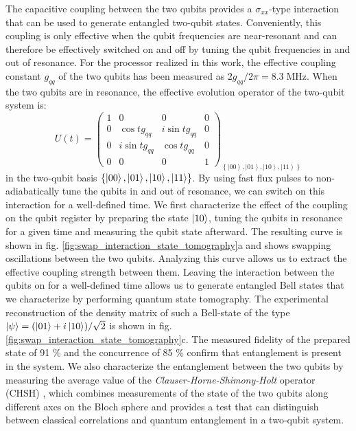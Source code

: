 The capacitive coupling between the two qubits provides a $\sigma_{xx}$-type
interaction that can be used to generate entangled two-qubit states.
Conveniently, this coupling is only effective when the qubit frequencies
are near-resonant and can therefore be effectively switched on and
off by tuning the qubit frequencies in and out of resonance. For the
processor realized in this work, the effective coupling constant $g_{qq}$
of the two qubits has been measured as $2g_{qq}/2\pi=8.3\;\mathrm{MHz}$.
When the two qubits are in resonance, the effective evolution operator
of the two-qubit system is:
%
\begin{equation}
U(t)=\left(\begin{array}{cccc}
1 & 0 & 0 & 0\\
0 & \cos{tg_{qq}} & i\sin{tg_{qq}} & 0\\
0 & i\sin{tg_{qq}} & \cos{tg_{qq}} & 0\\
0 & 0 & 0 & 1\end{array}\right)_{\left\{ \left|00\right\rangle ,\left|01\right\rangle ,\left|10\right\rangle ,\left|11\right\rangle \right\} } \label{eq:swap_evolution_operator}
\end{equation}
%
in the two-qubit basis $\{\left| 00 \right>,\left| 01 \right>,\left| 10 \right>,\left| 11 \right>\}$. By using fast flux pulses to non-adiabatically tune the qubits in
and out of resonance, we can switch on this interaction for a well-defined
time. We first characterize the effect of the coupling on the qubit
register by preparing the state $\left| 10 \right>$, tuning the qubits in
resonance for a given time and measuring the qubit state afterward.
The resulting curve is shown in fig. \ref{fig:swap_interaction_state_tomography}a
and shows swapping oscillations between the two qubits. Analyzing
this curve allows us to extract the effective coupling strength between
them. Leaving the interaction between the qubits on for a well-defined
time allows us to generate entangled Bell states that we characterize
by performing quantum state tomography. The experimental reconstruction
of the density matrix of such a Bell-state of the type $\left| \psi \right>=(\left| 01 \right>+i\left| 10 \right>)/\sqrt{2}$
is shown in fig. \ref{fig:swap_interaction_state_tomography}c.
The measured fidelity of the prepared state of 91 \% and the concurrence
of 85 \% confirm that entanglement is present in the system. We also
characterize the entanglement between the two qubits by measuring the average value of the \textit{Clauser-Horne-Shimony-Holt}
operator (CHSH) \citep{clauser_proposed_1969}, which
combines measurements of the state of the two qubits along different
axes on the Bloch sphere and provides a test that can distinguish
between classical correlations and quantum entanglement in a two-qubit
system.

